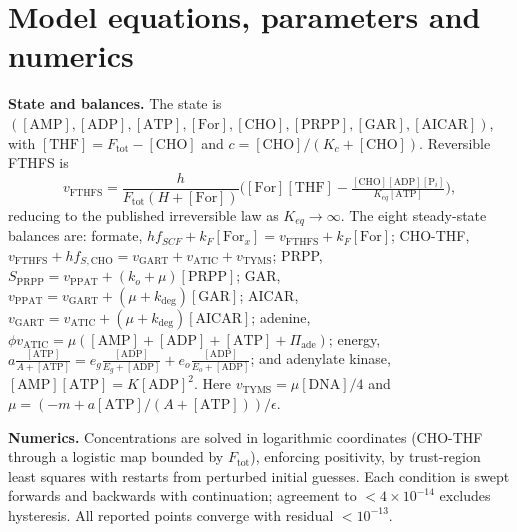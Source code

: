\documentclass[a4paper,fleqn]{cas-sc}
\begin{document}
\appendix
\section{Model equations, parameters and numerics}
\label{app:model}

\textbf{State and balances.} The state is
$([\mathrm{AMP}],[\mathrm{ADP}],[\mathrm{ATP}],[\mathrm{For}],[\mathrm{CHO}],
[\mathrm{PRPP}],[\mathrm{GAR}],[\mathrm{AICAR}])$, with
$[\mathrm{THF}]=F_{\mathrm{tot}}-[\mathrm{CHO}]$ and
$c=[\mathrm{CHO}]/(K_c+[\mathrm{CHO}])$. Reversible FTHFS is
\begin{equation*}
v_{\mathrm{FTHFS}}=\frac{h}{F_{\mathrm{tot}}(H+[\mathrm{For}])}
\Big([\mathrm{For}][\mathrm{THF}]
-\tfrac{[\mathrm{CHO}][\mathrm{ADP}][\mathrm{P}_i]}{K_{eq}[\mathrm{ATP}]}\Big),
\end{equation*}
reducing to the published irreversible law as $K_{eq}\to\infty$. The eight
steady-state balances are: formate,
$hf_{SCF}+k_F[\mathrm{For}_x]=v_{\mathrm{FTHFS}}+k_F[\mathrm{For}]$; CHO-THF,
$v_{\mathrm{FTHFS}}+hf_{S,\mathrm{CHO}}=v_{\mathrm{GART}}+v_{\mathrm{ATIC}}
+v_{\mathrm{TYMS}}$; PRPP,
$S_{\mathrm{PRPP}}=v_{\mathrm{PPAT}}+(k_o+\mu)[\mathrm{PRPP}]$; GAR,
$v_{\mathrm{PPAT}}=v_{\mathrm{GART}}+(\mu+k_{\mathrm{deg}})[\mathrm{GAR}]$; AICAR,
$v_{\mathrm{GART}}=v_{\mathrm{ATIC}}+(\mu+k_{\mathrm{deg}})[\mathrm{AICAR}]$;
adenine, $\phi v_{\mathrm{ATIC}}=\mu([\mathrm{AMP}]+[\mathrm{ADP}]
+[\mathrm{ATP}]+\Pi_{\mathrm{ade}})$; energy,
$a\frac{[\mathrm{ATP}]}{A+[\mathrm{ATP}]}
=e_g\frac{[\mathrm{ADP}]}{E_g+[\mathrm{ADP}]}
+e_o\frac{[\mathrm{ADP}]}{E_o+[\mathrm{ADP}]}$; and adenylate kinase,
$[\mathrm{AMP}][\mathrm{ATP}]=K[\mathrm{ADP}]^2$. Here
$v_{\mathrm{TYMS}}=\mu[\mathrm{DNA}]/4$ and $\mu=(-m+a[\mathrm{ATP}]/(A+[\mathrm{ATP}]))/\epsilon$.

\textbf{Numerics.} Concentrations are solved in logarithmic coordinates (CHO-THF
through a logistic map bounded by $F_{\mathrm{tot}}$), enforcing positivity, by
trust-region least squares with restarts from perturbed initial guesses. Each
condition is swept forwards and backwards with continuation; agreement to
$<4\times10^{-14}$ excludes hysteresis. All reported points converge with
residual $<10^{-13}$.
\end{document}
